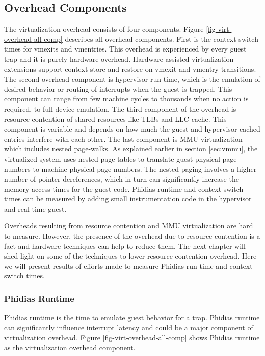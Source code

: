 \subsection{Overhead Components} \label{sec:overheadcomp}
The virtualization overhead consists of four components. 
Figure \ref{fig-virt-overhead-all-comp} describes all overhead components.
First is the context switch times for vmexits and vmentries.
This overhead is experienced by every guest trap and it is purely hardware overhead.
Hardware-assisted virtualization extensions support context store and restore on vmexit and vmentry transitions.
The second overhead component is hypervisor run-time, which is the emulation of desired behavior or routing of interrupts when the guest is trapped.
This component can range from few machine cycles to thousands when no action is required, to full device emulation.
The third component of the overhead is resource contention of shared resources like TLBs and LLC cache.
This component is variable and depends on how much the guest and hypervisor cached entries interfere with each other.
The last component is MMU virtualization which includes nested page-walks. 
As explained earlier in section \ref{sec:vmmu}, the virtualized system uses nested page-tables to translate 
guest physical page numbers to machine physical page numbers. The nested paging involves a higher number of pointer dereferences, which in turn
can significantly increase the memory access times for the guest code.
Phidias runtime and context-switch times can be measured by adding small instrumentation code in the hypervisor and real-time guest. 

Overheads resulting from resource contention and MMU virtualization are hard to measure.
However, the presence of the overhead due to resource contention is a fact and hardware techniques can help to reduce them.
The next chapter will shed light on some of the techniques to lower resource-contention overhead.
Here we will present results of efforts made to measure Phidias run-time and context-switch times.



\subsubsection{Phidias Runtime}
Phidias runtime is the time to emulate guest behavior for a trap. 
Phidias runtime can significantly influence interrupt latency and could be a major component of virtualization overhead.
Figure \ref{fig-virt-overhead-all-comp} shows Phidias runtime as the virtualization overhead component.

